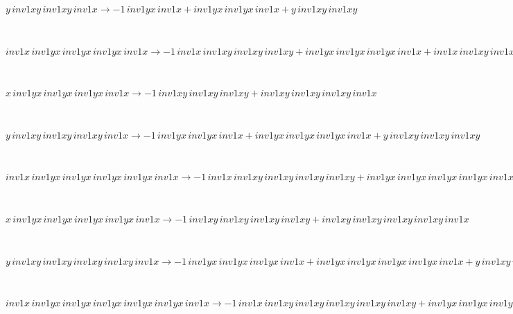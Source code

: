 \begin{minipage}{6in}
$
y\,
 inv1xy\,
 inv1xy\,
 inv1x\rightarrow -1\,
 inv1yx\,
 inv1x + inv1yx\,
 inv1yx\,
 inv1x + y\,
 inv1xy\,
 inv1xy
$
\end{minipage}\medskip \\
\begin{minipage}{6in}
$
inv1x\,
 inv1yx\,
 inv1yx\,
 inv1yx\,
 inv1x\rightarrow -1\,
 inv1x\,
 inv1xy\,
 inv1xy\,
 inv1xy + inv1yx\,
 inv1yx\,
 inv1yx\,
 inv1x + inv1x\,
 inv1xy\,
 inv1xy\,
 inv1xy\,
 inv1x
$
\end{minipage}\medskip \\
\begin{minipage}{6in}
$
x\,
 inv1yx\,
 inv1yx\,
 inv1yx\,
 inv1x\rightarrow -1\,
 inv1xy\,
 inv1xy\,
 inv1xy + inv1xy\,
 inv1xy\,
 inv1xy\,
 inv1x
$
\end{minipage}\medskip \\
\begin{minipage}{6in}
$
y\,
 inv1xy\,
 inv1xy\,
 inv1xy\,
 inv1x\rightarrow -1\,
 inv1yx\,
 inv1yx\,
 inv1x + inv1yx\,
 inv1yx\,
 inv1yx\,
 inv1x + y\,
 inv1xy\,
 inv1xy\,
 inv1xy
$
\end{minipage}\medskip \\
\begin{minipage}{6in}
$
inv1x\,
 inv1yx\,
 inv1yx\,
 inv1yx\,
 inv1yx\,
 inv1x\rightarrow -1\,
 inv1x\,
 inv1xy\,
 inv1xy\,
 inv1xy\,
 inv1xy + inv1yx\,
 inv1yx\,
 inv1yx\,
 inv1yx\,
 inv1x + inv1x\,
 inv1xy\,
 inv1xy\,
 inv1xy\,
 inv1xy\,
 inv1x
$
\end{minipage}\medskip \\
\begin{minipage}{6in}
$
x\,
 inv1yx\,
 inv1yx\,
 inv1yx\,
 inv1yx\,
 inv1x\rightarrow -1\,
 inv1xy\,
 inv1xy\,
 inv1xy\,
 inv1xy + inv1xy\,
 inv1xy\,
 inv1xy\,
 inv1xy\,
 inv1x
$
\end{minipage}\medskip \\
\begin{minipage}{6in}
$
y\,
 inv1xy\,
 inv1xy\,
 inv1xy\,
 inv1xy\,
 inv1x\rightarrow -1\,
 inv1yx\,
 inv1yx\,
 inv1yx\,
 inv1x + inv1yx\,
 inv1yx\,
 inv1yx\,
 inv1yx\,
 inv1x + y\,
 inv1xy\,
 inv1xy\,
 inv1xy\,
 inv1xy
$
\end{minipage}\medskip \\
\begin{minipage}{6in}
$
inv1x\,
 inv1yx\,
 inv1yx\,
 inv1yx\,
 inv1yx\,
 inv1yx\,
 inv1x\rightarrow -1\,
 inv1x\,
 inv1xy\,
 inv1xy\,
 inv1xy\,
 inv1xy\,
 inv1xy + inv1yx\,
 inv1yx\,
 inv1yx\,
 inv1yx\,
 inv1yx\,
 inv1x + inv1x\,
 inv1xy\,
 inv1xy\,
 inv1xy\,
 inv1xy\,
 inv1xy\,
 inv1x
$
\end{minipage}\medskip \\
